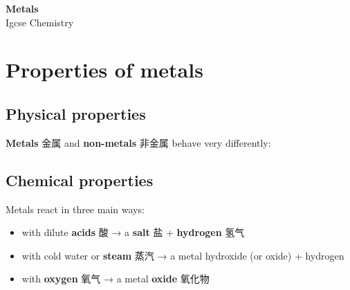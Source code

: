 \documentclass[11pt]{article}
\begin{document}
\begin{center}
  {\LARGE\bfseries Metals}\\[0.35em]
  {\large Igcse Chemistry}
\end{center}
\vspace{0.6em}

\section*{Properties of metals}

\subsection*{Physical properties}

\textbf{Metals} 金属 and \textbf{non-metals} 非金属 behave very differently:

\begin{center}
\end{center}

\subsection*{Chemical properties}

Metals react in three main ways:

\begin{itemize}
\item with dilute \textbf{acids} 酸 → a \textbf{salt} 盐 + \textbf{hydrogen} 氢气

\item with cold water or \textbf{steam} 蒸汽 → a metal hydroxide (or oxide) + hydrogen

\item with \textbf{oxygen} 氧气 → a metal \textbf{oxide} 氧化物

\end{itemize}
\end{document}
